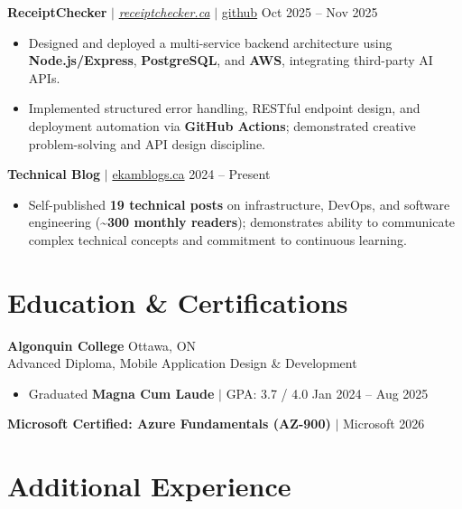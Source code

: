 \documentclass[11pt,a4paper]{article}
\begin{document}
\vspace{4pt}

\textbf{ReceiptChecker} $|$ \href{https://receiptchecker.ca/}{\emph{receiptchecker.ca}} $|$ \href{https://github.com/bhat0155/receipt-check}{\small github} \hfill Oct 2025 -- Nov 2025
\begin{itemize}
    \item Designed and deployed a multi-service backend architecture using \textbf{Node.js/Express}, \textbf{PostgreSQL}, and \textbf{AWS}, integrating third-party AI APIs.
    \item Implemented structured error handling, RESTful endpoint design, and deployment automation via \textbf{GitHub Actions}; demonstrated creative problem-solving and API design discipline.
\end{itemize}

\vspace{4pt}

\textbf{Technical Blog} $|$ \href{https://www.ekamblogs.ca}{ekamblogs.ca} \hfill 2024 -- Present
\begin{itemize}
    \item Self-published \textbf{19 technical posts} on infrastructure, DevOps, and software engineering (\textasciitilde\textbf{300 monthly readers}); demonstrates ability to communicate complex technical concepts and commitment to continuous learning.
\end{itemize}

\section{Education \& Certifications}

\textbf{Algonquin College} \hfill Ottawa, ON \\
Advanced Diploma, Mobile Application Design \& Development
\begin{itemize}
    \item Graduated \textbf{Magna Cum Laude} $|$ GPA: 3.7 / 4.0 \hfill Jan 2024 -- Aug 2025
\end{itemize}
\textbf{Microsoft Certified: Azure Fundamentals (AZ-900)} $|$ Microsoft \hfill 2026

\section{Additional Experience}
\end{document}
